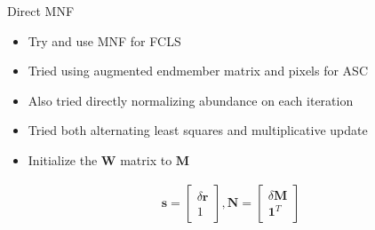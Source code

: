 \documentclass{beamer}
\begin{document}
\begin{frame}{Direct MNF}
    \begin{itemize}
        \item Try and use MNF for FCLS
        \item Tried using augmented endmember matrix and pixels for ASC
        \item Also tried directly normalizing abundance on each iteration
        \item Tried both alternating least squares and multiplicative update
        \item Initialize the \(\mathbf{W}\) matrix to \(\mathbf{M}\)
    \end{itemize}

\begin{align*}
\mathbf{s} = \begin{bmatrix}
\delta\mathbf{r} \\ 1
\end{bmatrix},
\mathbf{N} = \begin{bmatrix}
\delta \mathbf{M} \\ \mathbf{1}^T
\end{bmatrix}
\end{align*}

\end{frame}
\end{document}
